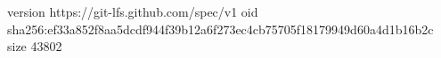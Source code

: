 version https://git-lfs.github.com/spec/v1
oid sha256:ef33a852f8aa5dcdf944f39b12a6f273ec4cb75705f18179949d60a4d1b16b2c
size 43802
